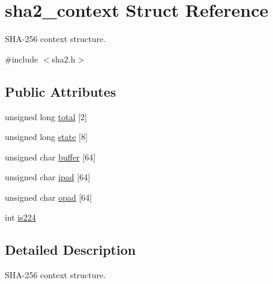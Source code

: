 \hypertarget{structsha2__context}{\section{sha2\+\_\+context Struct Reference}
\label{structsha2__context}
}


S\+H\+A-\/256 context structure.  




{\ttfamily \#include $<$sha2.\+h$>$}

\subsection*{Public Attributes}
\begin{DoxyCompactItemize}
\item 
unsigned long \hyperlink{structsha2__context_a485843c955ab26a3d78d499934371df1}{total} \mbox{[}2\mbox{]}
\item 
unsigned long \hyperlink{structsha2__context_a61a62a66ac1851bcd90aa65e7fad1328}{state} \mbox{[}8\mbox{]}
\item 
unsigned char \hyperlink{structsha2__context_aa5c93c2e2e8fc23008a849ea4f9a0b91}{buffer} \mbox{[}64\mbox{]}
\item 
unsigned char \hyperlink{structsha2__context_a4b003f9de8a8d823d19e813311764bd2}{ipad} \mbox{[}64\mbox{]}
\item 
unsigned char \hyperlink{structsha2__context_a3f710fbbb4c2c1ce3d57de40b1036cea}{opad} \mbox{[}64\mbox{]}
\item 
int \hyperlink{structsha2__context_a20fd61f8c14d811e93b7186ca71ecfbd}{is224}
\end{DoxyCompactItemize}


\subsection{Detailed Description}
S\+H\+A-\/256 context structure. 

